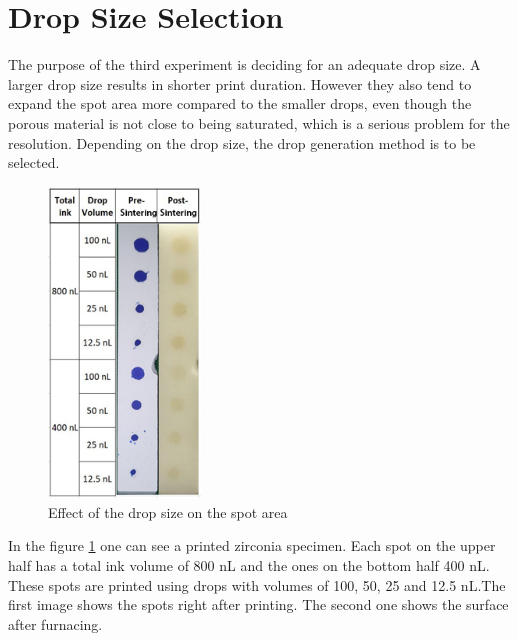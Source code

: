 \section{Drop Size Selection}
The purpose of the third experiment is deciding for an adequate drop size. A larger drop size results in shorter print duration. However they also tend to expand the spot area more compared to the smaller drops, even though the porous material is not close to being saturated, which is a serious problem for the resolution. Depending on the drop size, the drop generation method is to be selected.
 
\bigskip
\begin{figure}[H]
	\centering
	\includegraphics[width=0.36\textwidth]{grafiken/DropSize.jpg}
	\caption{Effect of the drop size on the spot area}
	\label{fig:DropSize}
\end{figure} 
\bigskip

In the figure \ref{fig:DropSize} one can see a printed zirconia specimen. Each spot on the upper half has a total ink volume of 800 nL and the ones on the bottom half 400 nL. These spots are printed using drops with volumes of 100, 50, 25 and 12.5 nL.The first image shows the spots right after printing. The second one shows the surface after furnacing.

\bigskip

